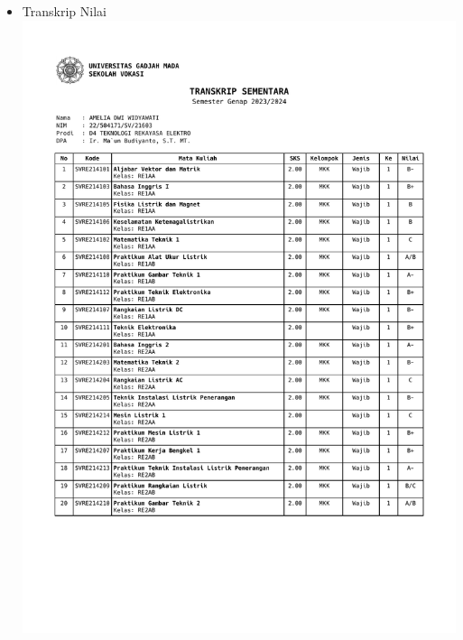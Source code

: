 \begin{itemize}
	\newpage		
	\item Transkrip Nilai\\
	\includegraphics[scale=0.7,page=1]{dokumen/transkrip_amelia.pdf}
	\newpage

\end{itemize}
